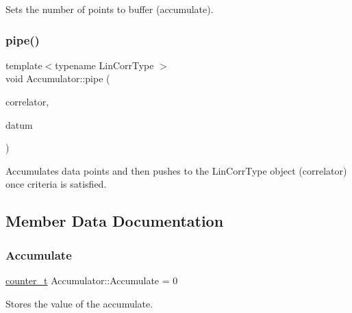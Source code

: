 Sets the number of points to buffer (accumulate). 

\mbox{\label{classAccumulator_a0b77af4be52d4c8f627cefb1f5315c98}} 
\subsubsection{\texorpdfstring{pipe()}{pipe()}}
{\footnotesize\ttfamily template$<$typename Lin\+Corr\+Type $>$ \\
void Accumulator\+::pipe (\begin{DoxyParamCaption}\item[{Lin\+Corr\+Type \&}]{correlator,  }\item[{const \hyperlink{types_8hpp_a22f279793847eba127de149437848c48}{counter\+\_\+t}}]{datum }\end{DoxyParamCaption})\hspace{0.3cm}{\ttfamily [inline]}}



Accumulates data points and then pushes to the {\ttfamily Lin\+Corr\+Type} object (correlator) once criteria is satisfied. 



\subsection{Member Data Documentation}
\mbox{\label{classAccumulator_a8e615af8b85dd2c8500d1f8c473879ab}} 
\subsubsection{\texorpdfstring{Accumulate}{Accumulate}}
{\footnotesize\ttfamily \hyperlink{types_8hpp_a22f279793847eba127de149437848c48}{counter\+\_\+t} Accumulator\+::\+Accumulate = 0\hspace{0.3cm}{\ttfamily [private]}}



Stores the value of the accumulate. 

\mbox{\label{classAccumulator_a6e4595169413a77122fe56cdd39137ae}} 
